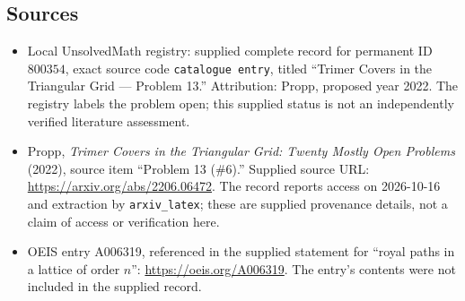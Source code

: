 \documentclass[11pt]{article}
\begin{document}
\subsection{Sources}
\begin{itemize}
\item Local UnsolvedMath registry: supplied complete record for permanent ID \(800354\), exact source code \texttt{catalogue entry}, titled ``Trimer Covers in the Triangular Grid --- Problem 13.'' Attribution: Propp, proposed year 2022. The registry labels the problem open; this supplied status is not an independently verified literature assessment.
\item Propp, \emph{Trimer Covers in the Triangular Grid: Twenty Mostly Open Problems} (2022), source item ``Problem 13 (\#6).'' Supplied source URL: \url{https://arxiv.org/abs/2206.06472}. The record reports access on 2026-10-16 and extraction by \texttt{arxiv\_latex}; these are supplied provenance details, not a claim of access or verification here.
\item OEIS entry A006319, referenced in the supplied statement for ``royal paths in a lattice of order \(n\)'': \url{https://oeis.org/A006319}. The entry's contents were not included in the supplied record.
\end{itemize}
\end{document}
